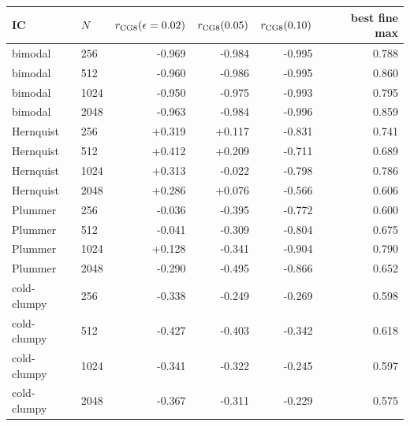 \begin{tabular}{llrrrr}
\toprule
IC & $N$ & $r_{\rm CG8}(\epsilon=0.02)$ & $r_{\rm CG8}(0.05)$ & $r_{\rm CG8}(0.10)$ & best fine max\\
\midrule
bimodal & 256 & -0.969 & -0.984 & -0.995 & 0.788\\
bimodal & 512 & -0.960 & -0.986 & -0.995 & 0.860\\
bimodal & 1024 & -0.950 & -0.975 & -0.993 & 0.795\\
bimodal & 2048 & -0.963 & -0.984 & -0.996 & 0.859\\
\midrule
Hernquist & 256 & +0.319 & +0.117 & -0.831 & 0.741\\
Hernquist & 512 & +0.412 & +0.209 & -0.711 & 0.689\\
Hernquist & 1024 & +0.313 & -0.022 & -0.798 & 0.786\\
Hernquist & 2048 & +0.286 & +0.076 & -0.566 & 0.606\\
\midrule
Plummer & 256 & -0.036 & -0.395 & -0.772 & 0.600\\
Plummer & 512 & -0.041 & -0.309 & -0.804 & 0.675\\
Plummer & 1024 & +0.128 & -0.341 & -0.904 & 0.790\\
Plummer & 2048 & -0.290 & -0.495 & -0.866 & 0.652\\
\midrule
cold-clumpy & 256 & -0.338 & -0.249 & -0.269 & 0.598\\
cold-clumpy & 512 & -0.427 & -0.403 & -0.342 & 0.618\\
cold-clumpy & 1024 & -0.341 & -0.322 & -0.245 & 0.597\\
cold-clumpy & 2048 & -0.367 & -0.311 & -0.229 & 0.575\\
\midrule
\bottomrule
\end{tabular}
